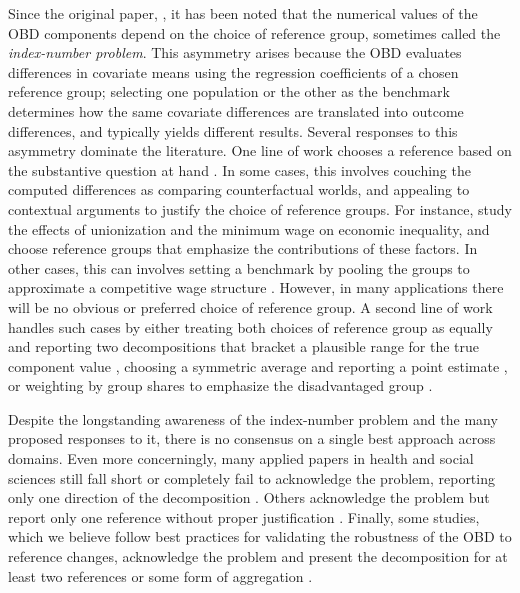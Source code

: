 
Since the original paper, \citep{oaxaca1973}, it has been noted that the numerical values of the OBD components depend on the choice of reference group, sometimes called the \textit{index-number problem}.
This asymmetry arises because the OBD evaluates differences in covariate means using the regression coefficients of a chosen reference group; selecting one population or the other as the benchmark determines how the same covariate differences are translated into outcome differences, and typically yields different results.
Several responses to this asymmetry dominate the literature. 
One line of work chooses a reference based on the substantive question at hand \citep{fortinLemieuxFirpo2011,jann2008}. 
In some cases, this involves couching the computed differences as comparing counterfactual worlds, and appealing to contextual arguments to justify the choice of reference groups.
For instance, \citet{dinardoFortinLemieux1996} study the effects of unionization and the minimum wage on economic inequality, and choose reference groups that emphasize the contributions of these factors.
In other cases, this can involves setting a benchmark by pooling the groups to approximate a competitive wage structure \citep{neumark1988,oaxacaRansom1994}.
However, in many applications there will be no obvious or preferred choice of reference group.
A second line of work handles such cases by either treating both choices of reference group as equally 
and reporting two decompositions that bracket a plausible range for the true component value \citep{oaxaca1973,blinder1973}, choosing a symmetric average and reporting a point estimate \citep{reimers1983}, or weighting by group shares to emphasize the disadvantaged group \citep{cotton1988}. 


Despite the longstanding awareness of the index-number problem and the many proposed responses to it, there is no consensus on a single best approach across domains. 
Even more concerningly, many applied papers in health and social sciences still fall short or completely fail to acknowledge the problem, reporting only one direction of the decomposition \citep{zhang_2019, ayubiShahbaziKhazaei2024,paradaContzen2025}. 
Others acknowledge the problem but report only one reference without proper justification \citep{singleton2016,lamJamiesonMittinty2021, alHanawiNjagi2022}. 
Finally, some studies, which we believe follow best practices for validating the robustness of the OBD to reference changes, acknowledge the problem and present the decomposition for at least two references or some form of aggregation \citep{sharafRashad2016,rahimiNazari2021}.

